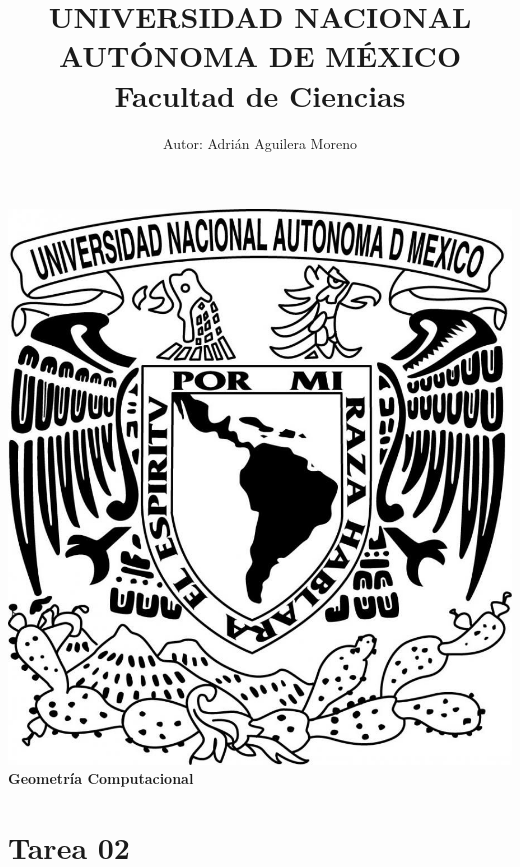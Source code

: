 \documentclass{article}
\begin{document}
\title{UNIVERSIDAD NACIONAL AUT\'ONOMA DE M\'EXICO\\ Facultad de Ciencias}
\author{Autor: Adri\'an Aguilera Moreno}
\date{}
\maketitle
\begin{center}
  \includegraphics[scale=0.20]{../Imagen/Portada.jpg}\\[0.4cm]
  \Large
  \bf{Geometría Computacional}
  \normalsize
\end{center}
\newpage
{}
\section*{\LARGE{Tarea 02}}


\newpage


\newpage


\newpage


\newpage



\newpage

\newpage


\end{document}
